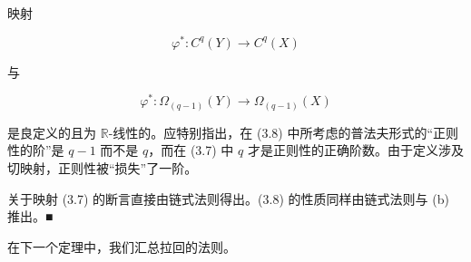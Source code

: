 \begin{remark}
\begin{items}
\item

映射

\begin{equation}
\varphi^{*} : C^{q}(Y) \to C^{q}(X)\tag{3.7}
\end{equation}

与

\begin{equation}
\varphi^{*} : \Omega_{(q-1)}(Y) \to \Omega_{(q-1)}(X)\tag{3.8}
\end{equation}

是良定义的且为 $ \mathbb{R} $-线性的。应特别指出，在 (3.8) 中所考虑的普法夫形式的“正则性的阶”是 $ q - 1 $ 而不是 $ q $，而在 (3.7) 中 $ q $ 才是正则性的正确阶数。由于定义涉及切映射，正则性被“损失”了一阶。

\proofhead
关于映射 (3.7) 的断言直接由链式法则得出。(3.8) 的性质同样由链式法则与 (b) 推出。\nobreak\hspace{0.35em}■
\end{items}

在下一个定理中，我们汇总拉回的法则。

\end{remark}

